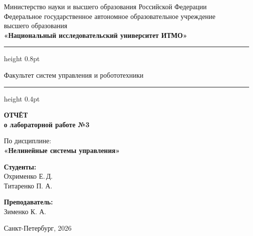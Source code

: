 \documentclass[a4paper,12pt]{article}
\begin{document}
	
	\begin{titlepage}
		\centering
		
		\vspace*{0.5cm}
		{\small
			Министерство науки и высшего образования Российской Федерации\\[2pt]
			Федеральное государственное автономное образовательное учреждение\\
			высшего образования\\[2pt]
			\textbf{«Национальный исследовательский университет ИТМО»}\\
		}
		
		\vspace{0.8cm}
		\hrule height 0.8pt
		\vspace{0.3cm}
		
		{\large Факультет систем управления и робототехники}
		
		\vspace{0.3cm}
		\hrule height 0.4pt
		\vspace{2.5cm}
		
		{\Huge\bfseries ОТЧЁТ}\\[0.4cm]
		{\LARGE\bfseries о лабораторной работе №3}\\[0.8cm]
		
		\begin{tcolorbox}[
			colback=gray!4,
			colframe=gray!10,
			boxrule=0.8pt,
			arc=4pt,
			left=12pt, right=12pt, top=8pt, bottom=8pt
			]
			\centering
			{\large По дисциплине:\\[4pt]}
			{\large\bfseries «Нелинейные системы управления»}\\[10pt]
		\end{tcolorbox}
		
		\vspace{5cm}
		
		\begin{minipage}{0.45\textwidth}
			\raggedright
			{\large\bfseries Студенты:}\\[4pt]
			Охрименко Е.\,Д.\\
			Титаренко П. А.
		\end{minipage}
		\hfill
		\begin{minipage}{0.45\textwidth}
			\raggedleft
			{\large\bfseries Преподаватель:}\\[4pt]
			Зименко К. А.\\
		\end{minipage}
		
		\vfill
		\vspace{0.4cm}
		{\large Санкт-Петербург, 2026}
	\end{titlepage}
	
\end{document}
